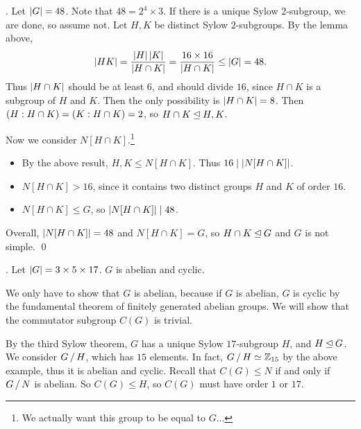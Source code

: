 \ex. Let \(\left| G \right| = 48\). Note that \(48 = 2^4 \times 3\). If there is a unique Sylow \(2\)-subgroup, we are done, so assume not. Let \(H, K\) be distinct Sylow \(2\)-subgroups. By the lemma above,
\[
    \left| HK \right| = \frac{\left| H \right| \left| K \right|}{\left| H \cap K \right|} = \frac{16 \times 16}{\left| H \cap K \right|} \leq \left| G \right| = 48.
\]
Thus \(\left| H \cap K \right|\) should be at least \(6\), and should divide \(16\), since \(H \cap K\) is a subgroup of \(H\) and \(K\). Then the only possibility is \(\left| H \cap K \right| = 8\). Then \(\left(H : H \cap K\right) = \left(K : H \cap K\right) = 2\), so \(H \cap K \unlhd H, K\).

Now we consider \(N[H \cap K]\).\footnote{We actually want this group to be equal to \(G\)...}
\begin{itemize}
    \item By the above result, \(H, K \leq N[H \cap K]\). Thus \(16 \mid \left| N[H \cap K] \right|\).
    \item \(N[H \cap K] > 16\), since it contains two distinct groups \(H\) and \(K\) of order \(16\).
    \item \(N[H \cap K] \leq G\), so \(\left| N[H\cap K] \right| \mid 48\).
\end{itemize}

Overall, \(\left| N[H\cap K] \right| = 48\) and \(N[H \cap K] = G\), so \(H \cap K \unlhd G\) and \(G\) is not simple. \qed

\ex. Let \(\left| G \right| = 3 \times 5 \times 17\). \(G\) is abelian and cyclic.

\pf We only have to show that \(G\) is abelian, because if \(G\) is abelian, \(G\) is cyclic by the fundamental theorem of finitely generated abelian groups. We will show that the commutator subgroup \(C(G)\) is trivial.

By the third Sylow theorem, \(G\) has a unique Sylow \(17\)-subgroup \(H\), and \(H \unlhd G\). We consider \(G \operatorname{/} H\), which has \(15\) elements. In fact, \(G \operatorname{/} H \simeq \mathbb{Z}_{15}\) by the above example, thus it is abelian and cyclic. Recall that \(C(G) \leq N\) if and only if \(G \operatorname{/} N\) is abelian. So \(C(G) \leq H\), so \(C(G)\) must have order \(1\) or \(17\).

